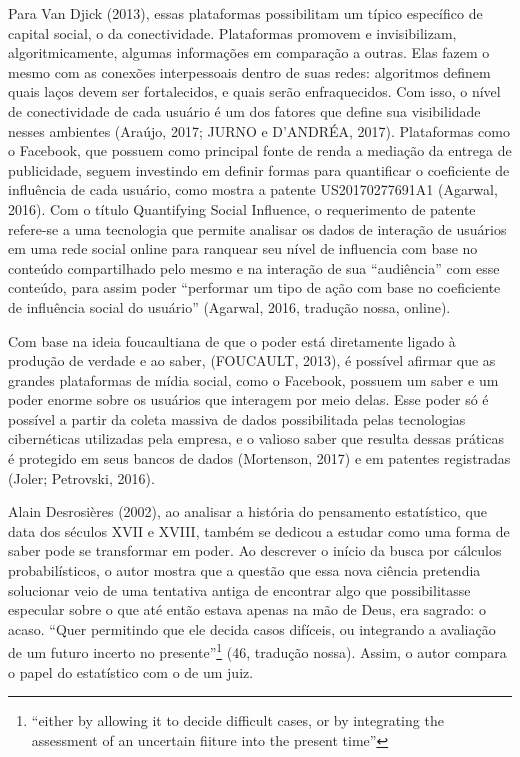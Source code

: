 Para Van Djick (2013), essas plataformas possibilitam um típico
específico de capital social, o da conectividade. Plataformas promovem e
invisibilizam, algoritmicamente, algumas informações em comparação a
outras. Elas fazem o mesmo com as conexões interpessoais dentro de suas
redes: algoritmos definem quais laços devem ser fortalecidos, e quais
serão enfraquecidos. Com isso, o nível de conectividade de cada usuário
é um dos fatores que define sua visibilidade nesses ambientes (Araújo, 2017; 
JURNO e D'ANDRÉA, 2017). Plataformas como o Facebook, que possuem como
principal fonte de renda a mediação da entrega de publicidade, seguem
investindo em definir formas para quantificar o coeficiente de
influência de cada usuário, como mostra a patente US20170277691A1
(Agarwal, 2016). Com o título Quantifying Social Influence, o
requerimento de patente refere-se a uma tecnologia que permite analisar
os dados de interação de usuários em uma rede social online para
ranquear seu nível de influencia com base no conteúdo compartilhado pelo
mesmo e na interação de sua ``audiência'' com esse conteúdo, para assim
poder ``performar um tipo de ação com base no coeficiente de influência
social do usuário'' (Agarwal, 2016, tradução nossa, online).

Com base na ideia foucaultiana de que o poder está diretamente ligado à
produção de verdade e ao saber, (FOUCAULT, 2013),
é possível afirmar que as grandes plataformas de mídia social, como o
Facebook, possuem um saber e um poder enorme sobre os usuários que
interagem por meio delas. Esse poder só é possível a partir da coleta
massiva de dados possibilitada pelas tecnologias cibernéticas utilizadas
pela empresa, e o valioso saber que resulta dessas práticas é protegido
em seus bancos de dados (Mortenson, 2017) e em patentes registradas
(Joler; Petrovski, 2016).

Alain Desrosières (2002), ao analisar a história do pensamento estatístico, que data dos séculos
XVII e XVIII, também se dedicou a estudar como uma forma de saber pode
se transformar em poder. Ao descrever o início da busca por cálculos
probabilísticos, o autor mostra que a questão que essa nova ciência
pretendia solucionar veio de uma tentativa antiga de encontrar algo que
possibilitasse especular sobre o que até então estava apenas na mão de
Deus, era sagrado: o acaso. ``Quer permitindo que ele decida casos
difíceis, ou integrando a avaliação de um futuro incerto no
presente''\footnote{``either by allowing it to decide difficult cases,
  or by integrating the assessment of an uncertain fiiture into the
  present time''} (46, tradução nossa). Assim, o autor compara o papel
do estatístico com o de um juiz.

